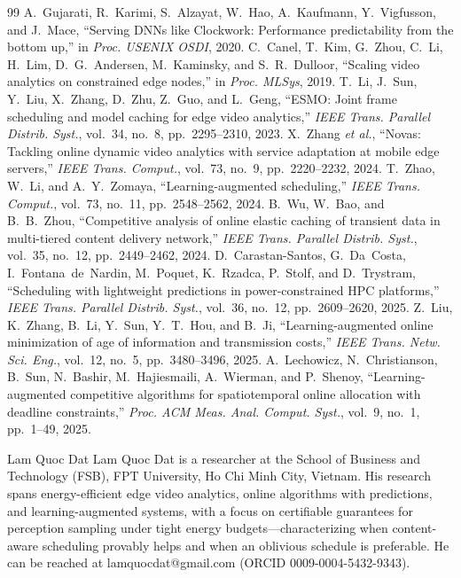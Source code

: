 ﻿\documentclass[lettersize,journal]{IEEEtran}
\begin{document}
\begin{thebibliography}{99}
 A.~Gujarati, R.~Karimi, S.~Alzayat, W.~Hao, A.~Kaufmann, Y.~Vigfusson, and J.~Mace, ``Serving DNNs like Clockwork: Performance predictability from the bottom up,'' in \emph{Proc. USENIX OSDI}, 2020.
 C.~Canel, T.~Kim, G.~Zhou, C.~Li, H.~Lim, D.~G.~Andersen, M.~Kaminsky, and S.~R.~Dulloor, ``Scaling video analytics on constrained edge nodes,'' in \emph{Proc. MLSys}, 2019.
 T.~Li, J.~Sun, Y.~Liu, X.~Zhang, D.~Zhu, Z.~Guo, and L.~Geng, ``ESMO: Joint frame scheduling and model caching for edge video analytics,'' \emph{IEEE Trans. Parallel Distrib. Syst.}, vol.~34, no.~8, pp.~2295--2310, 2023.
 X.~Zhang \emph{et al.}, ``Novas: Tackling online dynamic video analytics with service adaptation at mobile edge servers,'' \emph{IEEE Trans. Comput.}, vol.~73, no.~9, pp.~2220--2232, 2024.
 T.~Zhao, W.~Li, and A.~Y.~Zomaya, ``Learning-augmented scheduling,'' \emph{IEEE Trans. Comput.}, vol.~73, no.~11, pp.~2548--2562, 2024.
 B.~Wu, W.~Bao, and B.~B.~Zhou, ``Competitive analysis of online elastic caching of transient data in multi-tiered content delivery network,'' \emph{IEEE Trans. Parallel Distrib. Syst.}, vol.~35, no.~12, pp.~2449--2462, 2024.
 D.~Carastan-Santos, G.~Da~Costa, I.~Fontana~de~Nardin, M.~Poquet, K.~Rzadca, P.~Stolf, and D.~Trystram, ``Scheduling with lightweight predictions in power-constrained HPC platforms,'' \emph{IEEE Trans. Parallel Distrib. Syst.}, vol.~36, no.~12, pp.~2609--2620, 2025.
 Z.~Liu, K.~Zhang, B.~Li, Y.~Sun, Y.~T.~Hou, and B.~Ji, ``Learning-augmented online minimization of age of information and transmission costs,'' \emph{IEEE Trans. Netw. Sci. Eng.}, vol.~12, no.~5, pp.~3480--3496, 2025.
 A.~Lechowicz, N.~Christianson, B.~Sun, N.~Bashir, M.~Hajiesmaili, A.~Wierman, and P.~Shenoy, ``Learning-augmented competitive algorithms for spatiotemporal online allocation with deadline constraints,'' \emph{Proc. ACM Meas. Anal. Comput. Syst.}, vol.~9, no.~1, pp.~1--49, 2025.
\end{thebibliography}

\begin{IEEEbiographynophoto}{Lam Quoc Dat}
Lam Quoc Dat is a researcher at the School of Business and Technology (FSB), FPT University, Ho Chi Minh City, Vietnam. His research spans energy-efficient edge video analytics, online algorithms with predictions, and learning-augmented systems, with a focus on certifiable guarantees for perception sampling under tight energy budgets---characterizing when content-aware scheduling provably helps and when an oblivious schedule is preferable. He can be reached at lamquocdat@gmail.com (ORCID 0009-0004-5432-9343).
\end{IEEEbiographynophoto}
\end{document}
